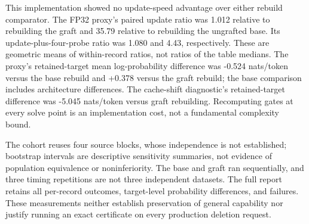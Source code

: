 This implementation showed no update-speed advantage over either rebuild comparator. The FP32 proxy's paired update ratio was 1.012 relative to rebuilding the graft and 35.79 relative to rebuilding the ungrafted base. Its update-plus-four-probe ratio was 1.080 and 4.43, respectively. These are geometric means of within-record ratios, not ratios of the table medians. The proxy's retained-target mean log-probability difference was -0.524 nats/token versus the base rebuild and +0.378 versus the graft rebuild; the base comparison includes architecture differences. The cache-shift diagnostic's retained-target difference was -5.045 nats/token versus graft rebuilding. Recomputing gates at every solve point is an implementation cost, not a fundamental complexity bound.

The cohort reuses four source blocks, whose independence is not established;
bootstrap intervals are descriptive sensitivity summaries, not evidence of
population equivalence or noninferiority. The base and graft ran sequentially,
and three timing repetitions are not three independent datasets. The
full report retains all per-record outcomes, target-level probability
differences, and failures. These measurements neither establish preservation
of general capability nor justify running an exact certificate on every
production deletion request.
